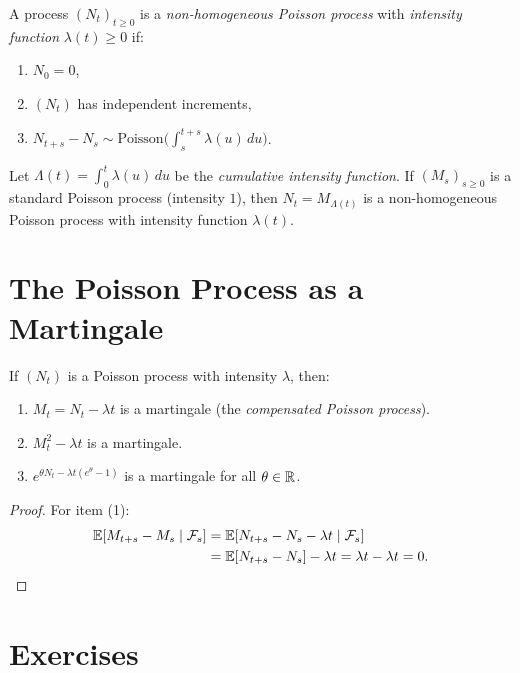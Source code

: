 \begin{definition}
A process $(N_t)_{t \geq 0}$ is a \emph{non-homogeneous Poisson process} with
\emph{intensity function} $\lambda(t) \geq 0$ if:
\begin{enumerate}
  \item $N_0 = 0$,
  \item $(N_t)$ has independent increments,
  \item $N_{t+s} - N_s \sim \text{Poisson}\bigl(\int_s^{t+s} \lambda(u) \, du\bigr)$.
\end{enumerate}
\end{definition}

\begin{proposition}
Let $\Lambda(t) = \int_0^t \lambda(u) \, du$ be the \emph{cumulative intensity
function}. If $(M_s)_{s \geq 0}$ is a standard Poisson process (intensity $1$),
then $N_t = M_{\Lambda(t)}$ is a non-homogeneous Poisson process with intensity
function $\lambda(t)$.
\end{proposition}

\section{The Poisson Process as a Martingale}

\begin{proposition}
\label{prop:poisson_martingale}
If $(N_t)$ is a Poisson process with intensity $\lambda$, then:
\begin{enumerate}
  \item $M_t = N_t - \lambda t$ is a martingale (the \emph{compensated Poisson process}).
  \item $M_t^2 - \lambda t$ is a martingale.
  \item $e^{\theta N_t - \lambda t(e^{\theta} - 1)}$ is a martingale for all $\theta \in \mathbb{R}$.
\end{enumerate}
\end{proposition}

\begin{proof}
For item (1):
\begin{align*}
  \mathbb{E}[M_{t+s} - M_s \mid \mathcal{F}_s]
  &= \mathbb{E}[N_{t+s} - N_s - \lambda t \mid \mathcal{F}_s] \\
  &= \mathbb{E}[N_{t+s} - N_s] - \lambda t = \lambda t - \lambda t = 0.
\end{align*}
\end{proof}

\section{Exercises}

